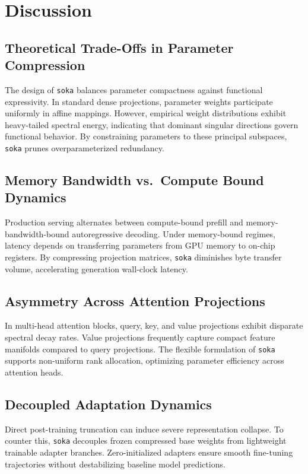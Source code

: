 \section{Discussion}

\subsection{Theoretical Trade-Offs in Parameter Compression}
The design of \texttt{soka} balances parameter compactness against functional expressivity. In standard dense projections, parameter weights participate uniformly in affine mappings. However, empirical weight distributions exhibit heavy-tailed spectral energy, indicating that dominant singular directions govern functional behavior. By constraining parameters to these principal subspaces, \texttt{soka} prunes overparameterized redundancy.

\subsection{Memory Bandwidth vs.\ Compute Bound Dynamics}
Production serving alternates between compute-bound prefill and memory-bandwidth-bound autoregressive decoding. Under memory-bound regimes, latency depends on transferring parameters from GPU memory to on-chip registers. By compressing projection matrices, \texttt{soka} diminishes byte transfer volume, accelerating generation wall-clock latency.

\subsection{Asymmetry Across Attention Projections}
In multi-head attention blocks, query, key, and value projections exhibit disparate spectral decay rates. Value projections frequently capture compact feature manifolds compared to query projections. The flexible formulation of \texttt{soka} supports non-uniform rank allocation, optimizing parameter efficiency across attention heads.

\subsection{Decoupled Adaptation Dynamics}
Direct post-training truncation can induce severe representation collapse. To counter this, \texttt{soka} decouples frozen compressed base weights from lightweight trainable adapter branches. Zero-initialized adapters ensure smooth fine-tuning trajectories without destabilizing baseline model predictions.

